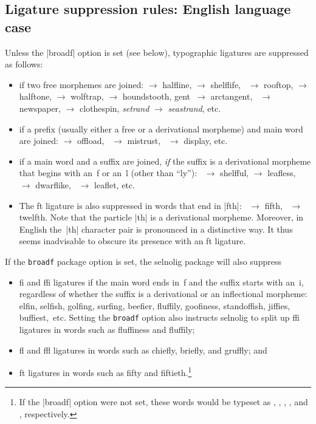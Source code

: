 \documentclass[11pt]{article}
\newcommand{\pkg}[1]{\textsf{#1}}
\newcommand{\opt}[1]{\texttt{#1}}
\begin{document}
\subsection{Ligature suppression rules: English language case}


Unless the |broadf| option is set (see below), typographic ligatures are suppressed as follows:
\begin{itemize}
\item if two free morphemes are joined:  $\to$ halfline,  $\to$ shelflife, ~$\to$ rooftop,  $\to$ halftone,  $\to$ wolftrap,  $\to$ houndstooth, \-gent~$\to$ arctangent, ~$\to$ newspaper,  $\to$ clothespin, \emph{setrand} $\to$ \emph{seastrand}, etc.

\item if a prefix (usually either a free or a derivational morpheme) and main word are joined:  $\to$ offload, ~$\to$ mistrust, ~$\to$ display, etc. 

\item if a main word and a suffix are joined, \emph{if} the suffix is a derivational morpheme that begins with an~f or an~l (other than \enquote{ly}): ~$\to$ shelfful,  $\to$ leafless, ~$\to$ dwarflike, ~$\to$ leaflet, etc. 

\item The ft ligature is also suppressed in words that end in |fth|: ~$\to$ fifth, ~$\to$ twelfth. Note that the particle |th| is a derivational morpheme. Moreover, in English the~|th| character pair is pronounced in a distinctive way. It thus seems inadvisable to obscure its presence with an ft ligature.

\end{itemize}

If the \opt{broadf} package option is set, the \pkg{selnolig} package will also suppress
\begin{itemize}
\item fi and ffi ligatures if the main word ends in~f and the suffix starts with an~i, regardless of whether the suffix is a derivational or an inflectional morpheme: elfin, selfish, golfing, surfing, beefier, fluffily, goofiness, standoffish, jiffies, buffiest,~etc. Setting the \opt{broadf} option also instructs \pkg{selnolig} to split up ffi ligatures in words such as fluffiness and fluffily;
\item fl and ffl ligatures in words such as chiefly, briefly, and gruffly; and
\item ft ligatures in words such as fifty and fiftieth.\footnote{If the |broadf| option were not set, these words would be typeset as , , , , and , respectively.}
\end{itemize}
\end{document}
